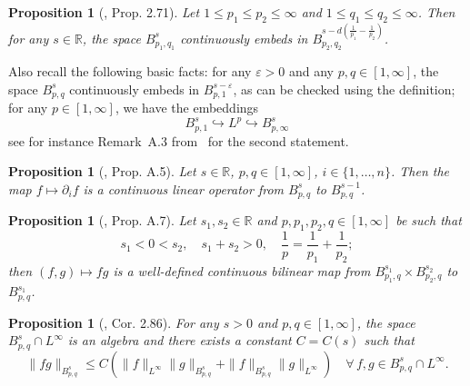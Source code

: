 \documentclass[11pt,oneside,reqno]{amsart}
\newtheorem{proposition}[theorem]{Proposition}
{\theoremstyle{remark}\newtheorem{remark}[theorem]{Remark}}
\numberwithin{equation}{section}
\begin{document}
\begin{proposition}[\cite{bahouri}, Prop. 2.71]
  \label{prop:besov-embeddings}Let $1 \leqslant p_1 \leqslant p_2 \leqslant
  \infty$ and $1 \leqslant q_1 \leqslant q_2 \leqslant \infty$. Then for any
  $s \in \mathbb{R}$, the space $B^s_{p_1, q_1}$ continuously embeds in $B^{s
  - d \left( \frac{1}{p_1} - \frac{1}{p_2} \right)}_{p_2, q_2}$.
\end{proposition}

Also recall the following basic facts: for any $\varepsilon > 0$ and any $p, q
\in [1, \infty]$, the space $B^s_{p, q}$ continuously embeds in $B^{s -
\varepsilon}_{p, 1}$, as can be checked using the definition; for any $p \in
[1, \infty]$, we have the embeddings
\[ B^s_{p, 1} \hookrightarrow L^p \hookrightarrow B^s_{p, \infty} \]
see for instance Remark~A.3 from~{\cite{mourrat}} for the second statement.

\begin{proposition}[{\cite{mourrat}}, Prop. A.5]
  \label{prop:besov-differentiation}Let $s \in \mathbb{R}$, $p, q \in [1,
  \infty]$, $i \in \{ 1, \ldots, n \}$. Then the map $f \mapsto \partial_i f$
  is a continuous linear operator from $B^s_{p, q}$ to $B^{s - 1}_{p, q}$.
\end{proposition}

\begin{proposition}[{\cite{mourrat}}, Prop. A.7]
  \label{prop:besov-paraproducts}Let $s_1, s_2 \in \mathbb{R}$ and $p, p_1,
  p_2, q \in [1, \infty]$ be such that
  \[ s_1 < 0 < s_2, \quad s_1 + s_2 > 0, \quad \frac{1}{p} = \frac{1}{p_1} +
     \frac{1}{p_2} ; \]
  then $(f, g) \mapsto f g$ is a well-defined continuous bilinear map from
  $B^{s_1}_{p_1, q} \times B^{s_2}_{p_2, q}$ to $B^{s_1}_{p, q}$.
\end{proposition}

\begin{proposition}[{\cite{bahouri}}, Cor. 2.86]
  \label{prop:besov-algebra}For any $s > 0$ and $p, q \in [1, \infty]$, the
  space $B^s_{p, q} \cap L^{\infty}$ is an algebra and there exists a constant
  $C = C (s)$ such that
  \[ \| f g \|_{B^s_{p, q}} \leqslant C (\| f \|_{L^{\infty}} \| g \|_{B^s_{p,
     q}} + \| f \|_{B^s_{p, q}} \| g \|_{L^{\infty}}) \quad \forall \, f, g
     \in B^s_{p, q} \cap L^{\infty} . \]
\end{proposition}
\end{document}
